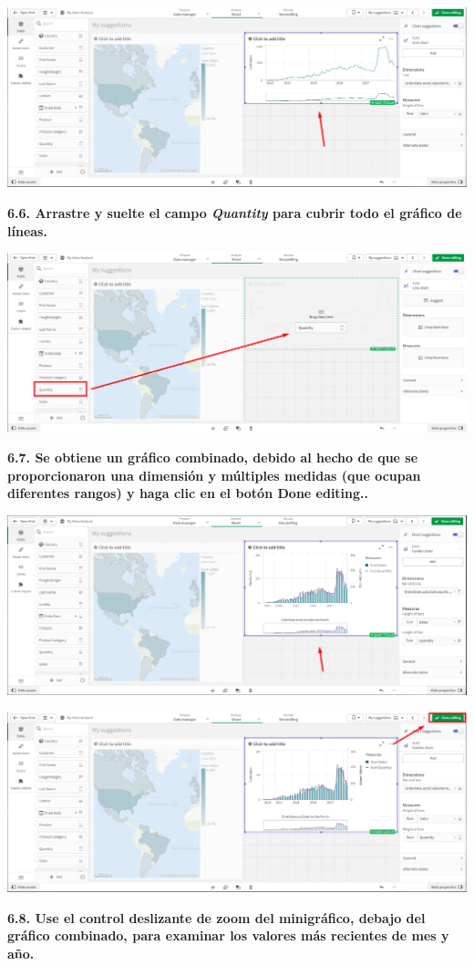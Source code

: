 \documentclass{article}
\begin{document}
    \begin{center}
		\includegraphics[width=14cm]{./images/21} 
	\end{center}

\textbf{6.6. Arrastre y suelte el campo \textit{Quantity} para 
cubrir todo el gráfico de líneas. }

    \begin{center}
		\includegraphics[width=14cm]{./images/22} 
	\end{center}
\newpage
\textbf{6.7. Se obtiene un gráfico combinado, debido al hecho de 
que se proporcionaron una dimensión y múltiples medidas 
(que ocupan diferentes rangos) y haga clic en el botón \textbf{Done editing}..}

    \begin{center}
		\includegraphics[width=14cm]{./images/22.1} 
	\end{center}
	 \begin{center}
		\includegraphics[width=14cm]{./images/22.2} 
	\end{center}
\newpage
\textbf{6.8. Use el control deslizante de zoom del minigráfico,
 debajo del gráfico combinado, para examinar los valores más
 recientes de mes y año.}
\end{document}

